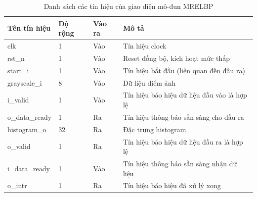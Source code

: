 \begin{table}[h]
    \centering
    \renewcommand{\arraystretch}{1.3} %
        \caption{Danh sách các tín hiệu của giao diện mô-đun MRELBP}
    \begin{tabular}{|p{3cm} p{2cm} p{2cm} p{8cm}|}
        \hline
        \rowcolor{gray!30}
        \textbf{Tên tín hiệu} & \textbf{Độ rộng} & \textbf{Vào ra} & \textbf{Mô tả} \\
        \hline
        clk & 1 & Vào & Tín hiệu clock \\
        \hline
        rst\_n & 1 & Vào & Reset đồng bộ, kích hoạt mức thấp \\
        \hline
        start\_i & 1 & Vào & Tín hiệu bắt đầu (liên quan đến đầu ra)
        \\ \hline
        grayscale\_i & 8 & Vào & Dữ liệu điểm ảnh 
        \\ \hline
        i\_valid & 1 & Vào & Tín hiệu báo hiệu dữ liệu đầu vào là hợp lệ
        \\ \hline
        o\_data\_ready & 1 & Ra & Tín hiệu thông báo sẵn sàng cho đầu ra
        \\ \hline
        histogram\_o & 32 & Ra & Đặc trưng histogram
        \\ \hline
        o\_valid & 1 & Ra & Tín hiệu báo hiệu dữ liệu đầu ra là hợp lệ
        \\ \hline
        i\_data\_ready & 1 & Vào & Tín hiệu thông báo sẵn sàng nhận dữ liệu
        \\ \hline
        o\_intr & 1 & Ra &Tín hiệu báo hiệu đã xử lý xong
        \\ \hline
    \end{tabular}

    \label{tab:signalListMRELBP}
\end{table}



